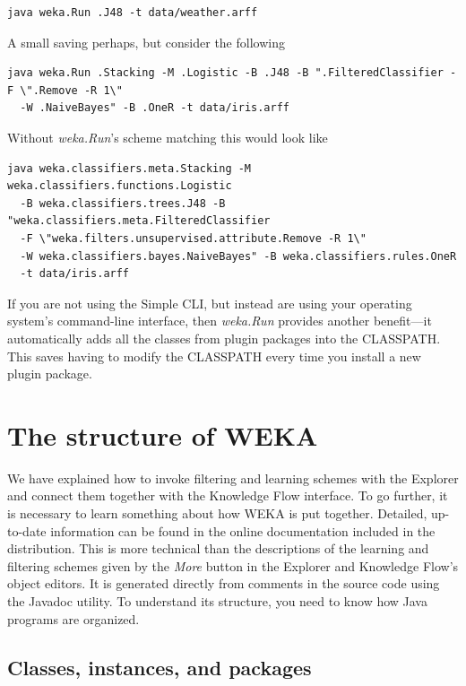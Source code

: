 \begin{Verbatim}[fontsize=\footnotesize]
java weka.Run .J48 -t data/weather.arff
\end{Verbatim}

\noindent A small saving perhaps, but consider the following

\begin{Verbatim}[fontsize=\footnotesize]
java weka.Run .Stacking -M .Logistic -B .J48 -B ".FilteredClassifier -F \".Remove -R 1\" 
  -W .NaiveBayes" -B .OneR -t data/iris.arff
\end{Verbatim}

\noindent Without {\em weka.Run}'s scheme matching this would look like

\begin{Verbatim}[fontsize=\footnotesize]
java weka.classifiers.meta.Stacking -M weka.classifiers.functions.Logistic 
  -B weka.classifiers.trees.J48 -B "weka.classifiers.meta.FilteredClassifier 
  -F \"weka.filters.unsupervised.attribute.Remove -R 1\" 
  -W weka.classifiers.bayes.NaiveBayes" -B weka.classifiers.rules.OneR 
  -t data/iris.arff
\end{Verbatim}

\noindent If you are not using the Simple CLI, but instead are using
your operating system's command-line interface, then {\em weka.Run} provides
another benefit---it automatically adds all the classes from plugin
packages into the CLASSPATH. This saves having to modify the CLASSPATH
every time you install a new plugin package.

\section{The structure of WEKA}

We have explained how to invoke filtering and learning schemes with
the Explorer and connect them together with the Knowledge Flow
interface. To go further, it is necessary to learn something about how
WEKA is put together. Detailed, up-to-date information can be found in
the online documentation included in the distribution. This is more
technical than the descriptions of the learning and filtering schemes
given by the \textit{More} button in the Explorer and Knowledge Flow's
object editors. It is generated directly from comments in the source
code using the Javadoc utility. To understand its structure, you
need to know how Java programs are organized.

\subsection{Classes, instances, and packages}


